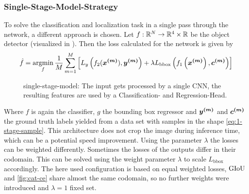 \subsubsection{Single-Stage-Model-Strategy}\label{subsubsec:2-in-1-model-strategy}
To solve the classification and localization task in a single pass through the network, a different approach is chosen.
Let $f: \mathbb{R}^{N}\rightarrow \mathbb{R}^4\times \mathbb{R}$ be the object detector (visualized in ).
Then the loss calculated for the network is given by
\begin{align}
    \hat{f} =
    \operatorname*{argmin}_f
    \frac{1}{M}
    \sum \limits_{m=1}^M
    \left[
        L_y\left(f_2(\bm{x^{(m)}}), \bm{y^{(m)}}\right)
        +
        \lambda
        L_{\text{bbox}}\left(
            f_1\left(\bm{x^{(m)}}\right),
            \bm{c^{(m)}}
        \right)
    \right]
\end{align}
\begin{figure}[!ht]
    \centering

    \caption{single-stage-model: The input gets processed by a single CNN, the resulting features are used by a Classification- and Regression-Head.}
    \label{fig:parallel-heads}
\end{figure}
Where $f$ is again the classifier, $g$ the bounding box regressor and $\bm{y^{(m)}}$ and $\bm{c^{(m)}}$ the ground truth labels yielded from a data set with samples in the shape \eqref{eq:1-stage-sample}.
This architecture does not crop the image during inference time, which can be a potential speed improvement.
Using the parameter $\lambda$ the losses can be weighted differently.
Sometimes the losses of the outputs differ in their codomain.
This can be solved using the weight parameter $\lambda$ to scale $L_{\text{bbox}}$ accordingly.
The here used configuration is based on equal weighted losses, $\text{GIoU}$ and \eqref{fig:cat-ce} share almost the same codomain, so no further weights were introduced and $\lambda = 1$ fixed set.

